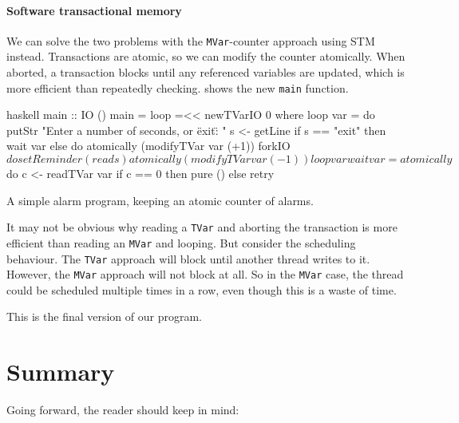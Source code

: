 \paragraph{Software transactional memory}
We can solve the two problems with the \verb|MVar|-counter approach
using STM instead.  Transactions are atomic, so we can modify the
counter atomically.  When aborted, a transaction blocks until any
referenced variables are updated, which is more efficient than
repeatedly checking.   shows the new \verb|main|
function.

\begin{listing}
\centering
\begin{cminted}{haskell}
main :: IO ()
main = loop =<< newTVarIO 0 where
  loop var = do
    putStr "Enter a number of seconds, or \"exit\": "
    s <- getLine
    if s == "exit"
      then wait var
      else do
        atomically (modifyTVar var (+1))
        forkIO $ do
          setReminder (read s)
          atomically (modifyTVar var (-1))
        loop var
  wait var = atomically $ do
    c <- readTVar var
    if c == 0 then pure () else retry
\end{cminted}
\caption{A simple alarm program, keeping an atomic counter of alarms.}\label{lst:ch_ex5}
\end{listing}

It may not be obvious why reading a \verb|TVar| and aborting the
transaction is more efficient than reading an \verb|MVar| and looping.
But consider the scheduling behaviour.  The \verb|TVar| approach will
block until another thread writes to it.  However, the \verb|MVar|
approach will not block at all.  So in the \verb|MVar| case, the
thread could be scheduled multiple times in a row, even though this is
a waste of time.

This is the final version of our program.

\vfill\pagebreak
\section{Summary}

Going forward, the reader should keep in mind:

